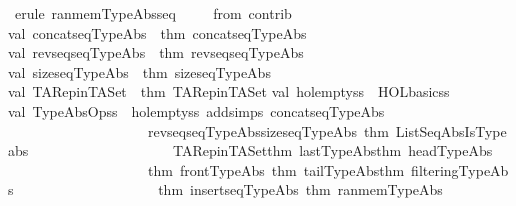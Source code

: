 \begin{isabellebody}
\isamarkupfalse%
\ {\isacharparenleft}erule\ ran{\isacharunderscore}mem{\isacharunderscore}TypeAbs{\isacharunderscore}seq{\isacharparenright}\isanewline
{}\isamarkupfalse%
%
\endisatagproof
{\isafoldproof}%
%
\isadelimproof
\isanewline
%
\endisadelimproof
\isanewline
\isanewline
\isanewline
\ \ \ \ \isanewline
\isanewline
%
\isadelimML
\isanewline
%
\endisadelimML
%
\isatagML
{}\isamarkupfalse%
\isanewline
{\isacharverbatimopen}\isanewline
{\isacharparenleft}{\isacharasterisk}from\ contrib{\isacharasterisk}{\isacharparenright}\isanewline
val\ concatseq{\isacharunderscore}TypeAbs\ {\isacharequal}\ thm\ {\isachardoublequote}concatseq{\isacharunderscore}TypeAbs{\isachardoublequote}\isanewline
val\ revseqseq{\isacharunderscore}TypeAbs\ {\isacharequal}\ thm\ {\isachardoublequote}revseqseq{\isacharunderscore}TypeAbs{\isachardoublequote}\isanewline
val\ sizeseq{\isacharunderscore}TypeAbs\ {\isacharequal}\ thm\ {\isachardoublequote}sizeseq{\isacharunderscore}TypeAbs{\isachardoublequote}\isanewline
val\ TARep{\isacharunderscore}in{\isacharunderscore}TASet\ {\isacharequal}\ thm\ {\isachardoublequote}TARep{\isacharunderscore}in{\isacharunderscore}TASet{\isachardoublequote}\isanewline
\isanewline
val\ holempty{\isacharunderscore}ss\ {\isacharequal}\ HOL{\isacharunderscore}basic{\isacharunderscore}ss\isanewline
\isanewline
val\ TypeAbs{\isacharunderscore}Op{\isacharunderscore}ss\ {\isacharequal}\ holempty{\isacharunderscore}ss\ addsimps\ {\isacharbrackleft}concatseq{\isacharunderscore}TypeAbs{\isacharcomma}\isanewline
\ \ \ \ \ \ \ \ \ \ \ \ \ \ \ \ \ \ \ \ revseqseq{\isacharunderscore}TypeAbs{\isacharcomma}sizeseq{\isacharunderscore}TypeAbs{\isacharcomma}\ thm\ {\isachardoublequote}ListSeqAbsIsTypeabs{\isachardoublequote}{\isacharcomma}\isanewline
\ \ \ \ \ \ \ \ \ \ \ \ \ \ \ \ \ \ \ \ TARep{\isacharunderscore}in{\isacharunderscore}TASet{\isacharcomma}thm\ {\isachardoublequote}last{\isacharunderscore}TypeAbs{\isachardoublequote}{\isacharcomma}thm\ {\isachardoublequote}head{\isacharunderscore}TypeAbs{\isachardoublequote}{\isacharcomma}\isanewline
\ \ \ \ \ \ \ \ \ \ \ \ \ \ \ \ \ \ \ \ thm\ {\isachardoublequote}front{\isacharunderscore}TypeAbs{\isachardoublequote}{\isacharcomma}\ thm\ {\isachardoublequote}tail{\isacharunderscore}TypeAbs{\isachardoublequote}{\isacharcomma}thm\ {\isachardoublequote}filtering{\isacharunderscore}TypeAbs{\isachardoublequote}{\isacharcomma}\isanewline
\ \ \ \ \ \ \ \ \ \ \ \ \ \ \ \ \ \ \ \ thm\ {\isachardoublequote}insertseq{\isacharunderscore}TypeAbs{\isachardoublequote}{\isacharcomma}\ thm\ {\isachardoublequote}ran{\isacharunderscore}mem{\isacharunderscore}TypeAbs{\isachardoublequote}{\isacharbrackright}\isanewline

\end{isabellebody}
